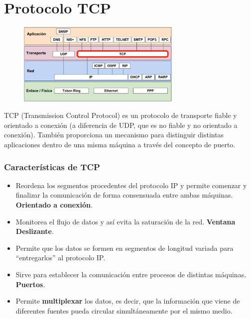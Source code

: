 \section{Protocolo TCP}
\begin{figure}[H]
    \centering
    \includegraphics[width=0.7\textwidth]{img/TCP.png}
\end{figure}
TCP (Transmission Control Protocol) es un protocolo de transporte fiable y orientado a conexión (a diferencia de UDP, que es no fiable y no orientado a conexión). También proporciona un mecanismo para distinguir distintas aplicaciones dentro de una misma máquina a través del concepto de puerto.

\subsubsection{Características de TCP}
\begin{itemize}
    \item Reordena los segmentos procedentes del protocolo IP y permite comenzar y finalizar la comunicación de forma consensuada entre ambas máquinas. \textbf{Orientado a conexión}.
    \item Monitorea el flujo de datos y así evita la saturación de la red. \textbf{Ventana Deslizante}.
    \item Permite que los datos se formen en segmentos de longitud variada para \enquote{entregarlos} al protocolo IP.
    \item Sirve para establecer la comunicación entre procesos de distintas máquinas. \textbf{Puertos}.
    \item Permite \textbf{multiplexar} los datos, es decir, que la información que viene de diferentes fuentes pueda circular simultáneamente por el mismo medio.
\end{itemize}
